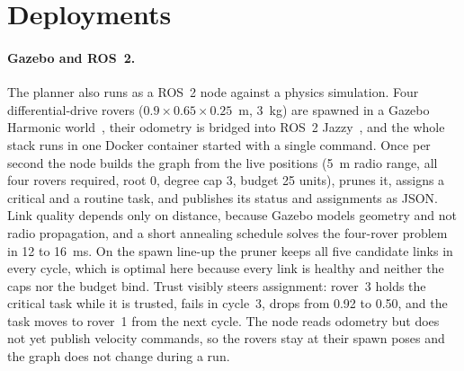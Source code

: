 \documentclass[11pt]{article}
\begin{document}
\section{Deployments}
\label{sec:deploy}

\paragraph{Gazebo and ROS~2.}
The planner also runs as a ROS~2 node against a physics simulation. Four
differential-drive rovers ($0.9\times0.65\times0.25$~m, 3~kg) are spawned in a
Gazebo Harmonic world~\cite{koenig2004}, their odometry is bridged into ROS~2
Jazzy~\cite{macenski2022}, and the
whole stack runs in one Docker container started with a single command. Once
per second the node builds the graph from the live positions (5~m radio range,
all four rovers required, root 0, degree cap 3, budget 25 units), prunes it,
assigns a critical and a routine task, and publishes its status and
assignments as JSON. Link quality depends only on distance, because Gazebo
models geometry and not radio propagation, and a short annealing schedule
solves the four-rover problem in 12 to 16~ms. On the spawn line-up the pruner
keeps all five candidate links in every cycle, which is optimal here because
every link is healthy and neither the caps nor the budget bind. Trust visibly
steers assignment: rover~3 holds the critical task while it is trusted, fails
in cycle~3, drops from 0.92 to 0.50, and the task moves to rover~1 from the
next cycle. The node reads odometry but does not yet publish velocity
commands, so the rovers stay at their spawn poses and the graph does not
change during a run.
\end{document}
